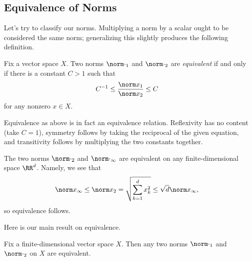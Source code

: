 \documentclass[../notes.tex]{subfiles}
\begin{document}
\subsection{Equivalence of Norms}
Let's try to classify our norms. Multiplying a norm by a scalar ought to be considered the same norm; generalizing this slightly produces the following definition.
\begin{definition}[equivalent]
	Fix a vector space $X$. Two norms $\norm\cdot_1$ and $\norm\cdot_2$ are \textit{equivalent} if and only if there is a constant $C>1$ such that
	\[C^{-1}\le\frac{\norm x_1}{\norm x_2}\le C\]
	for any nonzero $x\in X$.
\end{definition}
\begin{remark}
	Equivalence as above is in fact an equivalence relation. Reflexivity has no content (take $C=1$), symmetry follows by taking the reciprocal of the given equation, and transitivity follows by multiplying the two constants together.
\end{remark}
\begin{example}
	The two norms $\norm\cdot_2$ and $\norm\cdot_\infty$ are equivalent on any finite-dimensional space $\RR^d$. Namely, we see that
	\[\norm x_\infty\le\norm x_2=\sqrt{\sum_{k=1}^dx_k^2}\le\sqrt d\norm x_\infty,\]
	so equivalence follows.
\end{example}
Here is our main result on equivalence.
\begin{proposition} \label{prop:fin-dim-norms}
	Fix a finite-dimensional vector space $X$. Then any two norms $\norm\cdot_1$ and $\norm\cdot_2$ on $X$ are equivalent.
\end{proposition}
\end{document}
